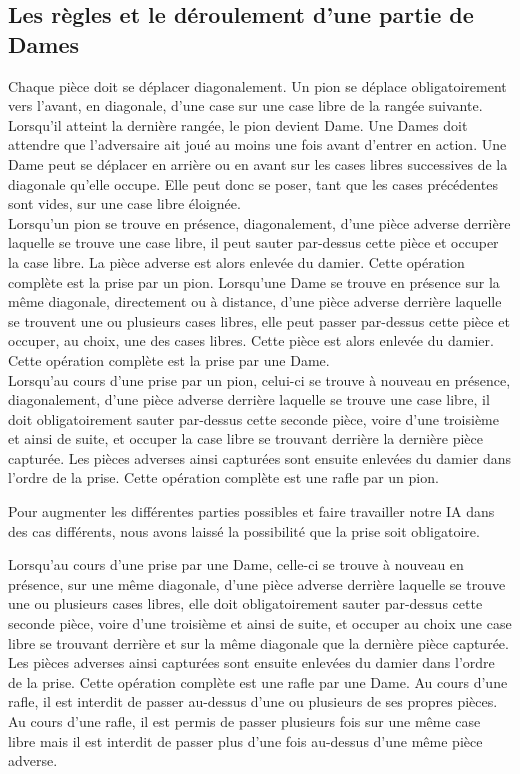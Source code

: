 \documentclass[12,french]{report}
\begin{document}
\subsection{Les règles et le déroulement d'une partie de Dames}

Chaque pièce doit se déplacer diagonalement. Un pion se déplace obligatoirement vers l’avant, en diagonale, d’une case sur une case libre de la rangée suivante. Lorsqu'il atteint la dernière rangée, le pion devient Dame. Une Dames doit attendre que l’adversaire ait joué au moins une fois avant d’entrer en action. Une Dame peut se déplacer en arrière ou en avant sur les cases libres successives de la diagonale qu’elle occupe. Elle peut donc se poser, tant que les cases précédentes sont vides, sur une case libre éloignée.\\

Lorsqu’un pion se trouve en présence, diagonalement, d’une pièce adverse derrière laquelle se trouve une case libre, il peut sauter par-dessus cette pièce et occuper la case libre. La pièce adverse est alors enlevée du damier. Cette opération complète est la prise par un pion. Lorsqu’une Dame se trouve en présence sur la même diagonale, directement ou à distance, d’une pièce adverse derrière laquelle se trouvent une ou plusieurs cases libres, elle peut passer par-dessus cette pièce et occuper, au choix, une des cases libres. Cette pièce est alors enlevée du damier. Cette opération complète est la prise par une Dame.\\

Lorsqu’au cours d’une prise par un pion, celui-ci se trouve à nouveau en présence, diagonalement, d’une pièce adverse derrière laquelle se trouve une case libre, il doit obligatoirement sauter par-dessus cette seconde pièce, voire d’une troisième et ainsi de suite, et occuper la case libre se trouvant derrière la dernière pièce capturée. 
Les pièces adverses ainsi capturées sont ensuite enlevées du damier dans l’ordre de la prise. Cette opération complète est une rafle par un pion.

Pour augmenter les différentes parties possibles et faire travailler notre IA dans des cas différents, nous avons laissé la possibilité que la prise soit obligatoire. 

 Lorsqu’au cours d’une prise par une Dame, celle-ci se trouve à nouveau en présence, sur une même diagonale, d’une pièce adverse derrière laquelle se trouve une ou plusieurs cases libres, elle doit obligatoirement sauter par-dessus cette seconde pièce, voire d’une troisième et ainsi de suite, et occuper au choix une case libre se trouvant derrière et sur la même diagonale que la dernière pièce capturée. Les pièces adverses ainsi capturées sont ensuite enlevées du damier dans l’ordre de la prise. Cette opération complète est une rafle par une Dame. Au cours d’une rafle, il est interdit de passer au-dessus d'une ou plusieurs de ses propres pièces. Au cours d’une rafle, il est permis de passer plusieurs fois sur une même case libre mais il est interdit de passer plus d’une fois au-dessus d’une même pièce adverse.\\
\end{document}
